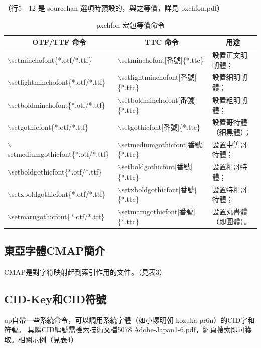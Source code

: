 （行5 - 12 是 sourcehan 選項時預設的，與之等價，詳見 pxchfon.pdf）

\begin{table}[H]
\begin{center}
\caption{pxchfon 宏包等價命令}
{\fontsize{8pt}{12}\selectfont\ttfamily
\begin{tabular}{|l|l|l|}
 \hline
 \multicolumn{1}{|c|}{OTF/TTF 命令} & \multicolumn{1}{|c|}{TTC 命令} & \multicolumn{1}{|c|}{用途} \\ \hline
$\backslash$setminchofont\{*.otf/*.ttf\} & $\backslash$setminchofont[番號]\{*.ttc\} & 設置正文明朝體；\\
$\backslash$setlightminchofont\{*.otf/*.ttf\} & $\backslash$setlightminchofont[番號]\{*.ttc\} & 設置細明朝體；\\
$\backslash$setboldminchofont\{*.otf/*.ttf\} & $\backslash$setboldminchofont[番號]\{*.ttc\} & 設置粗明朝體；\\
$\backslash$setgothicfont\{*.otf/*.ttf\} & $\backslash$setgothicfont[番號]\{*.ttc\} & 設置哥特體（細黑體）；\\
$\backslash$setmediumgothicfont\{*.otf/*.ttf\} & $\backslash$setmediumgothicfont[番號]\{*.ttc\} & 設置中等哥特體；\\
$\backslash$setboldgothicfont\{*.otf/*.ttf\} & $\backslash$setboldgothicfont[番號]\{*.ttc\} & 設置粗哥特體；\\
$\backslash$setxboldgothicfont\{*.otf/*.ttf\} & $\backslash$setxboldgothicfont[番號]\{*.ttc\} & 設置特粗哥特體；\\
$\backslash$setmarugothicfont\{*.otf/*.ttf\} & $\backslash$setmarugothicfont[番號]\{*.ttc\} & 設置丸書體（即圓體）。\\ \hline
\end{tabular} }
\end{center}
\end{table}


\subsection{東亞字體CMAP簡介}
\par{}CMAP是對字符映射起到索引作用的文件。（見表3）

\subsection{CID-Key和CID符號}

\par{}{up\LaTeXe}自帶一些系統命令，可以調用系統字體（如小塚明朝 kozuka-pr6n）的CID字和符號。
具體CID編號需檢索技術文檔{5078.Adobe-Japan1-6.pdf}，網頁搜索即可獲取。相關示例（見表4）


